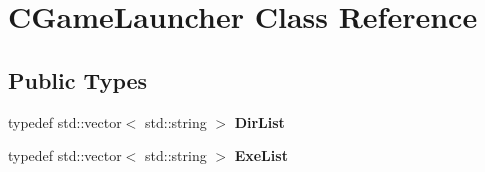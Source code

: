 \hypertarget{class_c_game_launcher}{
\section{CGameLauncher Class Reference}
\label{class_c_game_launcher}
}
\subsection*{Public Types}
\begin{DoxyCompactItemize}
\item 
\hypertarget{class_c_game_launcher_a8abe0301e6fb80c1f48bbb09c4b58c1f}{
typedef std::vector$<$ std::string $>$ {\bfseries DirList}}
\label{class_c_game_launcher_a8abe0301e6fb80c1f48bbb09c4b58c1f}

\item 
\hypertarget{class_c_game_launcher_a15d68825aa82979e50134b7cf7d488f3}{
typedef std::vector$<$ std::string $>$ {\bfseries ExeList}}
\label{class_c_game_launcher_a15d68825aa82979e50134b7cf7d488f3}

\end{DoxyCompactItemize}
